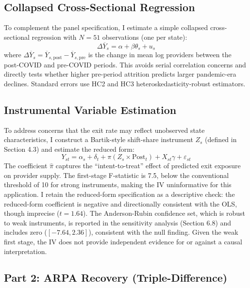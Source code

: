 \documentclass[12pt]{article}
\begin{document}
\subsection{Collapsed Cross-Sectional Regression}

To complement the panel specification, I estimate a simple collapsed cross-sectional regression with $N = 51$ observations (one per state):
\begin{equation}
\Delta \overline{Y}_s = \alpha + \beta \theta_s + u_s
\label{eq:collapsed}
\end{equation}
where $\Delta \overline{Y}_s = \overline{Y}_{s,\text{post}} - \overline{Y}_{s,\text{pre}}$ is the change in mean log providers between the post-COVID and pre-COVID periods. This avoids serial correlation concerns and directly tests whether higher pre-period attrition predicts larger pandemic-era declines. Standard errors use HC2 and HC3 heteroskedasticity-robust estimators.

\subsection{Instrumental Variable Estimation}

To address concerns that the exit rate may reflect unobserved state characteristics, I construct a Bartik-style shift-share instrument $Z_s$ (defined in Section 4.3) and estimate the reduced form:
\begin{equation}
Y_{st} = \alpha_s + \delta_t + \pi \left( Z_s \times \text{Post}_{t} \right) + X_{st} \gamma + \varepsilon_{st}
\end{equation}
The coefficient $\hat{\pi}$ captures the ``intent-to-treat'' effect of predicted exit exposure on provider supply. The first-stage F-statistic is 7.5, below the conventional threshold of 10 for strong instruments, making the IV uninformative for this application. I retain the reduced-form specification as a descriptive check: the reduced-form coefficient is negative and directionally consistent with the OLS, though imprecise ($t = 1.64$). The Anderson-Rubin confidence set, which is robust to weak instruments, is reported in the sensitivity analysis (Section 6.8) and includes zero ($[-7.64, 2.36]$), consistent with the null finding. Given the weak first stage, the IV does not provide independent evidence for or against a causal interpretation.

\subsection{Part 2: ARPA Recovery (Triple-Difference)}
\end{document}
